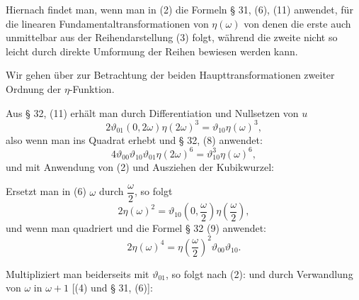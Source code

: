 
Hiernach findet man, wenn man in (2) die Formeln § 31, (6), (11)
anwendet, für die linearen Fundamentaltransformationen von
$\eta(\omega)$
von denen die erste auch unmittelbar aus der Reihendarstellung
(3) folgt, während die zweite nicht so leicht durch direkte
Umformung der Reihen bewiesen werden kann.

Wir gehen über zur Betrachtung der beiden Haupttransformationen
zweiter Ordnung der $\eta$-Funktion.

Aus § 32, (11) erhält man durch Differentiation und Nullsetzen
von $u$
\[ 2\vartheta_{01}(0, 2\omega)\eta(2\omega)^3 = \vartheta_{10}\eta(\omega)^3, \]
also wenn man ins Quadrat erhebt und § 32, (8) anwendet:
\[ 4\vartheta_{00}\vartheta_{10}\vartheta_{01}\eta(2\omega)^6 = \vartheta_{10}^3\eta(\omega)^6, \]
und mit Anwendung von (2) und Ausziehen der Kubikwurzel:

Ersetzt man in (6) $\omega$ durch $\dfrac{\omega}{2}$, so folgt
\[ 2\eta(\omega)^2 = \vartheta_{10}\left(0, \frac{\omega}{2}\right)\eta\left(\frac{\omega}{2}\right), \]
und wenn man quadriert und die Formel § 32 (9) anwendet:
\[ 2\eta(\omega)^4 = \eta\left(\frac{\omega}{2}\right)^2\vartheta_{00}\vartheta_{10}. \]

Multipliziert man beiderseits mit $\vartheta_{01}$, so folgt
nach (2):
und durch Verwandlung von $\omega$ in $\omega+1$ [(4) und § 31,
(6)]:
